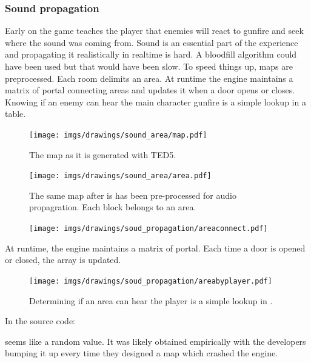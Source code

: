 \subsubsection{Sound propagation}
Early on the game teaches the player that enemies will react to gunfire and seek where the sound was coming from. Sound is an essential part of the experience and propagating it realistically in realtime is hard. A bloodfill algorithm could have been used but that would have been slow. To speed things up, maps are preprocessed. Each room delimits an area. At runtime the engine maintains a matrix of portal connecting areas and updates it when a door opens or closes. Knowing if an enemy can hear the main character gunfire is a simple lookup in a table.

\par
\begin{figure}[H]
 \centering
 \texttt{[image: imgs/drawings/sound\_area/map.pdf]}
 \caption{The map as it is generated with TED5.}
\end{figure}
\par

\par
\begin{figure}[H]
 \centering
 \texttt{[image: imgs/drawings/sound\_area/area.pdf]}
 \caption{The same map after is has been pre-processed for audio propagration. Each block belongs to an area.}
\end{figure}
\par



\begin{figure}[H]
 \centering
 \texttt{[image: imgs/drawings/soud\_propagation/areaconnect.pdf]}
\end{figure}
\par
At runtime, the engine maintains a matrix of portal. Each time a door is opened or closed, the array  is updated. 

\par
\begin{figure}[H]
 \centering
 \texttt{[image: imgs/drawings/soud\_propagation/areabyplayer.pdf]}
 \caption{Determining if an area can hear the player is a simple lookup in .}
\end{figure}
\par
In the source code:\\
\par
\begin{minipage}{\textwidth}

\end{minipage}
\par
{} seems like a random value. It was likely obtained empirically with the developers bumping it up every time they designed a map which crashed the engine.\\
\par







